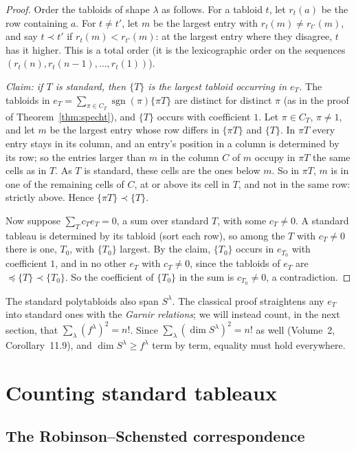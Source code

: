 \begin{proof}
Order the tabloids of shape $\lambda$ as follows. For a tabloid $t$, let $r_t(a)$ be the row containing $a$. For $t\ne t'$, let $m$ be the largest entry with $r_t(m)\ne r_{t'}(m)$, and say $t\prec t'$ if $r_t(m)<r_{t'}(m)$: at the largest
entry where they disagree, $t$ has it higher. This is a total order (it is the lexicographic order on the sequences $(r_t(n),r_t(n-1),\dots,r_t(1))$).

\emph{Claim: if $T$ is standard, then $\{T\}$ is the largest tabloid occurring in $e_T$.} The tabloids in $e_T=\sum_{\pi\in C_T}\operatorname{sgn}(\pi)\{\pi T\}$ are distinct for distinct $\pi$ (as in the proof of Theorem~\ref{thm:specht}), and
$\{T\}$ occurs with coefficient $1$. Let $\pi\in C_T$, $\pi\ne1$, and let $m$ be the largest entry whose row differs in $\{\pi T\}$ and $\{T\}$. In $\pi T$ every entry stays in its column, and an entry's position in a column is determined by its row;
so the entries larger than $m$ in the column $C$ of $m$ occupy in $\pi T$ the same cells as in $T$. As $T$ is standard, these cells are the ones below $m$. So in $\pi T$, $m$ is in one of the remaining cells of $C$, at or above its
cell in $T$, and not in the same row: strictly above. Hence $\{\pi T\}\prec\{T\}$.

Now suppose $\sum_Tc_Te_T=0$, a sum over standard $T$, with some $c_T\ne0$. A standard tableau is determined by its tabloid (sort each row), so among the $T$ with $c_T\ne0$ there is one, $T_0$, with $\{T_0\}$ largest. By the claim, $\{T_0\}$
occurs in $e_{T_0}$ with coefficient $1$, and in no other $e_T$ with $c_T\ne0$, since the tabloids of $e_T$ are $\preceq\{T\}\prec\{T_0\}$. So the coefficient of $\{T_0\}$ in the sum is $c_{T_0}\ne0$, a contradiction.
\end{proof}

The standard polytabloids also span $S^\lambda$. The classical proof straightens any $e_T$ into standard ones with the \emph{Garnir relations}; we will instead count, in the next section, that $\sum_\lambda(f^\lambda)^2=n!$. Since
$\sum_\lambda(\dim S^\lambda)^2=n!$ as well (Volume~2, Corollary~11.9), and $\dim S^\lambda\ge f^\lambda$ term by term, equality must hold everywhere.

\section{Counting standard tableaux}

\subsection*{The Robinson--Schensted correspondence}

